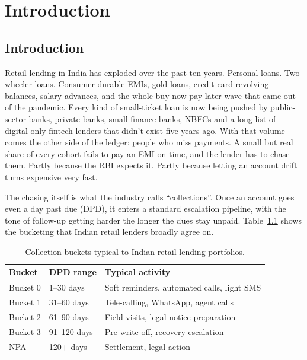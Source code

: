 \chapter{Introduction}
\label{Chapter 1}

\section{Introduction}
Retail lending in India has exploded over the past ten years. Personal loans. Two-wheeler loans. Consumer-durable EMIs, gold loans, credit-card revolving balances, salary advances, and the whole buy-now-pay-later wave that came out of the pandemic. Every kind of small-ticket loan is now being pushed by public-sector banks, private banks, small finance banks, NBFCs and a long list of digital-only fintech lenders that didn't exist five years ago. With that volume comes the other side of the ledger: people who miss payments. A small but real share of every cohort fails to pay an EMI on time, and the lender has to chase them. Partly because the RBI expects it. Partly because letting an account drift turns expensive very fast.

The chasing itself is what the industry calls ``collections''. Once an account goes even a day past due (DPD), it enters a standard escalation pipeline, with the tone of follow-up getting harder the longer the dues stay unpaid. Table~\ref{tab:dpd-buckets} shows the bucketing that Indian retail lenders broadly agree on.

\begin{table}[h]
\centering
\caption{Collection buckets typical to Indian retail-lending portfolios.}
\label{tab:dpd-buckets}
\begin{tabular}{lll}
\toprule
\textbf{Bucket} & \textbf{DPD range} & \textbf{Typical activity} \\
\midrule
Bucket 0 & 1--30 days   & Soft reminders, automated calls, light SMS \\
Bucket 1 & 31--60 days  & Tele-calling, WhatsApp, agent calls \\
Bucket 2 & 61--90 days  & Field visits, legal notice preparation \\
Bucket 3 & 91--120 days & Pre-write-off, recovery escalation \\
NPA      & 120+ days    & Settlement, legal action \\
\bottomrule
\end{tabular}
\end{table}

